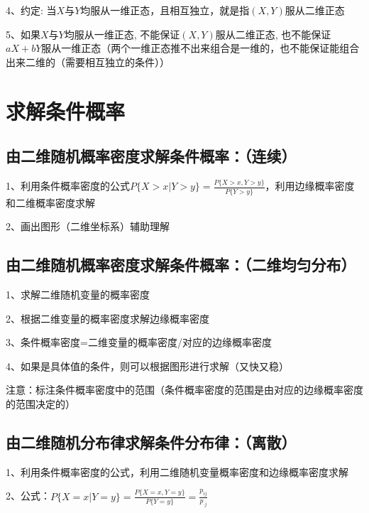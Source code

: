 4、约定: 当$X$与$Y$均服从一维正态，且相互独立，就是指$(X, Y)$服从二维正态

5、如果$X$与$Y$均服从一维正态, 不能保证$(X, Y)$服从二维正态, 也不能保证$a X+b Y$服从一维正态（两个一维正态推不出来组合是一维的，也不能保证能组合出来二维的（需要相互独立的条件））

\section{求解条件概率}



\subsection{由二维随机概率密度求解条件概率：（连续）}

1、利用条件概率密度的公式$P\{X>x|Y>y\} = \frac {P\{X>x,Y>y\}}{P\{Y>y\}}$，利用边缘概率密度和二维概率密度求解

2、画出图形（二维坐标系）辅助理解



\subsection{由二维随机概率密度求解条件概率：（二维均匀分布）}

1、求解二维随机变量的概率密度

2、根据二维变量的概率密度求解边缘概率密度

3、条件概率密度=二维变量的概率密度/对应的边缘概率密度

4、如果是具体值的条件，则可以根据图形进行求解（又快又稳）

注意：标注条件概率密度中的范围（条件概率密度的范围是由对应的边缘概率密度的范围决定的）



\subsection{由二维随机分布律求解条件分布律：（离散）}

1、利用条件概率密度的公式，利用二维随机变量概率密度和边缘概率密度求解

2、公式：$P\{X=x|Y=y\} = \frac {P\{X=x,Y=y\}}{P\{Y=y\}} = \frac {p_{ij}}{p_{\cdot j}}$



